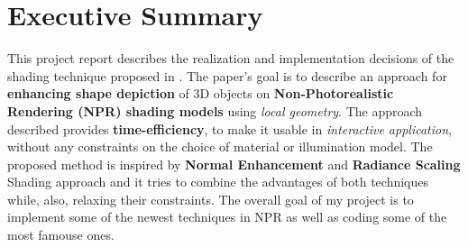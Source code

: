 \section*{Executive Summary}

This project report describes the realization and implementation decisions of the shading technique proposed in \cite{referencePaper}. \newline 
The paper's goal is to describe an approach for \textbf{enhancing shape depiction} of 3D objects on \textbf{Non-Photorealistic Rendering (NPR) shading models} using \textit{local geometry}. \newline
The approach described provides \textbf{time-efficiency}, to make it usable in \textit{interactive application}, without any constraints on the choice of material or illumination model. 
\newline The proposed method is inspired by \textbf{Normal Enhancement} and \textbf{Radiance Scaling} Shading approach and it tries to combine the advantages of both techniques while, also, relaxing their constraints. \newline
The overall goal of my project is to implement some of the newest techniques in NPR as well as coding some of the most famouse ones.